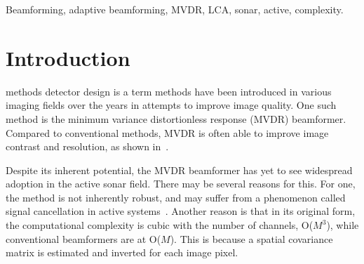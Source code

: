 \documentclass[10pt,journal,draftclsnofoot,onecolumn]{IEEEtran}
\newcommand\1{\vec 1}
\begin{document}
{\begin{abstract}
% 


\end{abstract}

\ifPeerReview\else
\begin{IEEEkeywords}\color{gray}
Beamforming, adaptive beamforming, MVDR, LCA, sonar, active, complexity.
\end{IEEEkeywords}
\fi}

\maketitle

\IEEEdisplaynotcompsoctitleabstractindextext


\IEEEpeerreviewmaketitle

\section{Introduction}

 
 methods detector design is a term methods have been introduced in various imaging fields over the years in attempts to improve image quality. One such method is the minimum variance distortionless response (MVDR) beamformer. Compared to conventional methods, MVDR is often able to improve image contrast and resolution, as shown in~\cite{Blomberg2013,Blomberg2012a,Dursun2009,Lo2004}.

Despite its inherent potential, the MVDR beamformer has yet to see widespread adoption in the active sonar field. There may be several reasons for this. For one, the method is not inherently robust, and may suffer from a phenomenon called signal cancellation in active systems~\cite{Widrow1982}. Another reason is that in its original form, the computational complexity is cubic with the number of channels, O($M^3$), while conventional beamformers are at O($M$). This is because a spatial covariance matrix is estimated and inverted for each image pixel.
\end{document}
